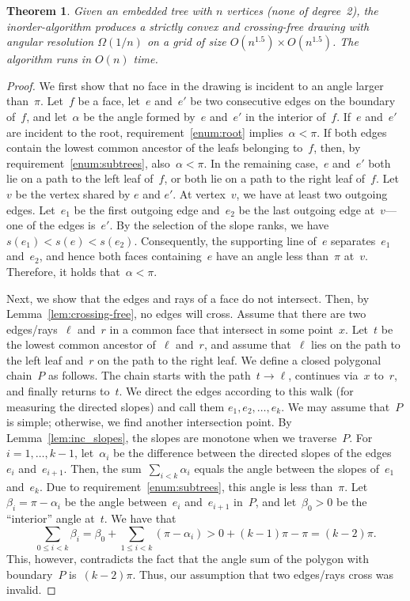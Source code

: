\documentclass[a4paper,11pt]{article}
\theoremstyle{plain}
\newtheorem{theorem}{Theorem}
\begin{document}
\begin{theorem}\label{thm:correctness}
  Given an embedded tree with $n$ vertices (none of degree~2), the 
	in\-order-algorithm produces a strictly convex and crossing-free drawing with
  angular resolution $\Omega(1/n)$ on a grid of size $O(n^{1.5})
  \times O(n^{1.5})$.  The algorithm runs in $O(n)$ time.
\end{theorem}
\begin{proof}
	We first show that no face in the drawing is incident to an angle larger 
	than~$\pi$. Let~$f$ be a face, let~$e$ and~$e'$ be two consecutive edges on 
	the boundary of~$f$, and let~$\alpha$ be the angle formed by~$e$ and~$e'$ in 
	the interior of~$f$.  If~$e$ and~$e'$ are incident to the root, 
	requirement~\ref{enum:root} implies~$\alpha<\pi$. If both edges contain the
	lowest common ancestor of the leafs belonging to~$f$, then, by 
	requirement~\ref{enum:subtrees}, also~$\alpha<\pi$. In the remaining 
	case,~$e$ and~$e'$ both lie on a path to the left leaf of~$f$, or both lie on 
	a path to the right leaf of~$f$. Let $v$ be the vertex shared by $e$ and $e'$.  At vertex~$v$, we have at least two outgoing 
	edges. Let~$e_1$ be the first outgoing edge and~$e_2$ be the last outgoing 
edge at~$v$---one of the edges is~$e'$. By the selection of the slope ranks,
	we have $s(e_1)<s(e)<s(e_2)$. Consequently, the supporting line of~$e$ 
	separates~$e_1$ and~$e_2$, and hence both faces containing~$e$ have an angle 
	less than~$\pi$ at~$v$. Therefore, it holds that~$\alpha<\pi$.
   
	Next, we show that the edges and rays of a face do not intersect. Then, by 
	Lemma~\ref{lem:crossing-free}, no edges will cross. Assume that there are two 
	edges/rays~$\ell$ and~$r$ in a common face that intersect in some point~$x$. 
	Let~$t$ be the lowest common ancestor of~$\ell$ and~$r$, and assume 
	that~$\ell$ lies on the path to the left leaf and~$r$ on the path to the 
	right leaf. We define a closed polygonal chain~$P$ as follows. The chain 
	starts with the path~$t\to\ell$, continues via~$x$ to~$r$, and 
	finally returns to~$t$. We direct the edges according to this walk (for 
	measuring the directed slopes) and call them $e_1, e_2,\dots, e_k$. We may 
	assume that~$P$ is simple; otherwise, we find another intersection point.  By 
	Lemma~\ref{lem:inc_slopes}, the slopes are monotone when we traverse~$P$.  
	For~$i=1,\dots,k-1$, let~$\alpha_i$ be the difference between the directed 
	slopes of the edges~$e_i$ and~$e_{i+1}$. Then, the sum~$\sum_{i<k} \alpha_i$ 
	equals the angle between the slopes of~$e_1$ and~$e_k$.  Due to 
	requirement~\ref{enum:subtrees}, this angle is less than~$\pi$. 
	Let~$\beta_i=\pi-\alpha_i$ be the angle between~$e_i$ and~$e_{i+1}$ in~$P$,
	and let~$\beta_0>0$ be the ``interior'' angle at~$t$. We have that 
	$$\sum_{0\le i <k} \beta_i
	= \beta_0 + \sum_{1\le i <k} (\pi -\alpha_i) > 0 + (k-1)\pi - \pi 
	= (k-2) \pi.$$ 
	This, however, contradicts the fact that the angle sum of the polygon with 
	boundary~$P$ is~$(k-2)\pi$. Thus, our assumption that two edges/rays cross was
	invalid.
   

\end{proof}
\end{document}
